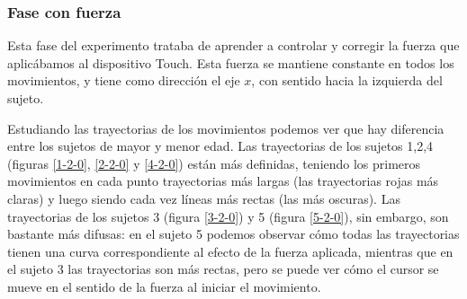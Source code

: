 \documentclass[a4paper,11pt, oneside]{book}
\begin{document}
\subsubsection{Fase con fuerza}

Esta fase del experimento trataba de aprender a controlar y corregir la fuerza que aplicábamos al dispositivo Touch. Esta fuerza se mantiene constante en todos los movimientos, y tiene como dirección el eje $x$, con sentido hacia la izquierda del sujeto.

Estudiando las trayectorias de los movimientos podemos ver que hay diferencia entre los sujetos de mayor y menor edad. Las trayectorias de los sujetos 1,2,4 (figuras \ref{1-2-0}, \ref{2-2-0} y \ref{4-2-0}) están más definidas, teniendo los primeros movimientos en cada punto trayectorias más largas (las trayectorias rojas más claras) y luego siendo cada vez líneas más rectas (las más oscuras). Las trayectorias de los sujetos 3 (figura \ref{3-2-0}) y 5 (figura \ref{5-2-0}), sin embargo, son bastante más difusas: en el sujeto 5 podemos observar cómo todas las trayectorias tienen una curva correspondiente al efecto de la fuerza aplicada, mientras que en el sujeto 3 las trayectorias son más rectas, pero se puede ver cómo el cursor se mueve en el sentido de la fuerza al iniciar el movimiento.
\end{document}
